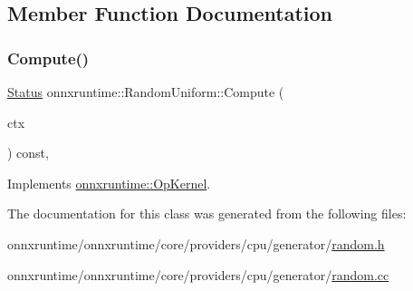 \subsection{Member Function Documentation}
\mbox{\label{classonnxruntime_1_1RandomUniform_a5a7d183518814aa5f09a31bb8188a290}} 
\subsubsection{\texorpdfstring{Compute()}{Compute()}}
{\footnotesize\ttfamily \mbox{\hyperlink{classonnxruntime_1_1common_1_1Status}{Status}} onnxruntime\+::\+Random\+Uniform\+::\+Compute (\begin{DoxyParamCaption}\item[{\mbox{\hyperlink{classonnxruntime_1_1OpKernelContext}{Op\+Kernel\+Context}} $\ast$}]{ctx }\end{DoxyParamCaption}) const\hspace{0.3cm}{\ttfamily [override]}, {\ttfamily [virtual]}}



Implements \mbox{\hyperlink{classonnxruntime_1_1OpKernel_a9eca8656a78b1b3ab9d3351a12798650}{onnxruntime\+::\+Op\+Kernel}}.



The documentation for this class was generated from the following files\+:\begin{DoxyCompactItemize}
\item 
onnxruntime/onnxruntime/core/providers/cpu/generator/\mbox{\hyperlink{random_8h}{random.\+h}}\item 
onnxruntime/onnxruntime/core/providers/cpu/generator/\mbox{\hyperlink{random_8cc}{random.\+cc}}\end{DoxyCompactItemize}
